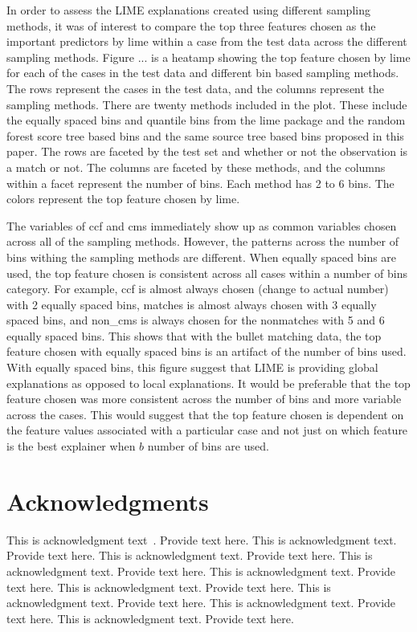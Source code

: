\documentclass[AMS,STIX2COL]{WileyNJD-v2}\usepackage[]{graphicx}\usepackage[]{color}
\begin{document}
In order to assess the LIME explanations created using different sampling methods, it was of interest to compare the top three features chosen as the important predictors by lime within a case from the test data across the different sampling methods. Figure ... is a heatamp showing the top feature chosen by lime for each of the cases in the test data and different bin based sampling methods. The rows represent the cases in the test data, and the columns represent the sampling methods. There are twenty methods included in the plot. These include the equally spaced bins and quantile bins from the lime package and the random forest score tree based bins and the same source tree based bins proposed in this paper. The rows are faceted by the test set and whether or not the observation is a match or not. The columns are faceted by these methods, and the columns within a facet represent the number of bins. Each method has 2 to 6 bins. The colors represent the top feature chosen by lime.

The variables of ccf and cms immediately show up as common variables chosen across all of the sampling methods. However, the patterns across the number of bins withing the sampling methods are different. When equally spaced bins are used, the top feature chosen is consistent across all cases within a number of bins category. For example, ccf is almost always chosen (change to actual number) with 2 equally spaced bins, matches is almost always chosen with 3 equally spaced bins, and non\_cms is always chosen for the nonmatches with 5 and 6 equally spaced bins. This shows that with the bullet matching data, the top feature chosen with equally spaced bins is an artifact of the number of bins used. With equally spaced bins, this figure suggest that LIME is providing global explanations as opposed to local explanations. It would be preferable that the top feature chosen was more consistent across the number of bins and more variable across the cases. This would suggest that the top feature chosen is dependent on the feature values associated with a particular case and not just on which feature is the best explainer when $b$ number of bins are used.


\section*{Acknowledgments}
This is acknowledgment text~\cite{Elbaum2002}. Provide text here. This is acknowledgment text. Provide text here. This is acknowledgment text. Provide text here. This is acknowledgment text. Provide text here. This is acknowledgment text. Provide text here. This is acknowledgment text. Provide text here. This is acknowledgment text. Provide text here. This is acknowledgment text. Provide text here. This is acknowledgment text. Provide text here. 
\end{document}

